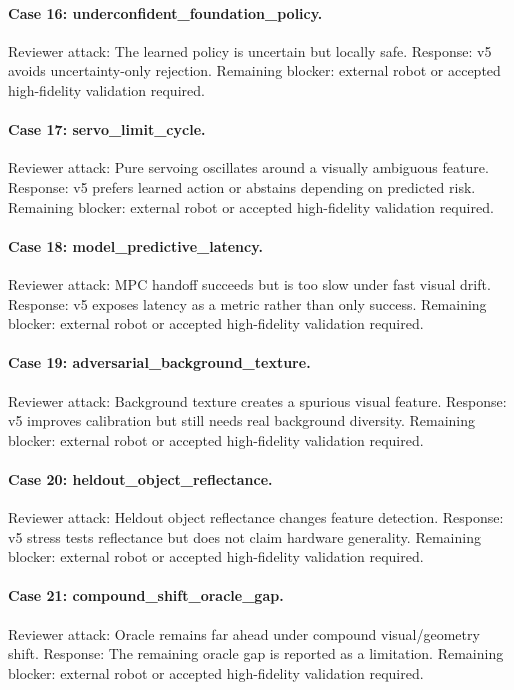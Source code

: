 \documentclass{article}
\begin{document}
\paragraph{Case 16: underconfident\_foundation\_policy.} Reviewer attack: The learned policy is uncertain but locally safe. Response: v5 avoids uncertainty-only rejection. Remaining blocker: external robot or accepted high-fidelity validation required.
\paragraph{Case 17: servo\_limit\_cycle.} Reviewer attack: Pure servoing oscillates around a visually ambiguous feature. Response: v5 prefers learned action or abstains depending on predicted risk. Remaining blocker: external robot or accepted high-fidelity validation required.
\paragraph{Case 18: model\_predictive\_latency.} Reviewer attack: MPC handoff succeeds but is too slow under fast visual drift. Response: v5 exposes latency as a metric rather than only success. Remaining blocker: external robot or accepted high-fidelity validation required.
\paragraph{Case 19: adversarial\_background\_texture.} Reviewer attack: Background texture creates a spurious visual feature. Response: v5 improves calibration but still needs real background diversity. Remaining blocker: external robot or accepted high-fidelity validation required.
\paragraph{Case 20: heldout\_object\_reflectance.} Reviewer attack: Heldout object reflectance changes feature detection. Response: v5 stress tests reflectance but does not claim hardware generality. Remaining blocker: external robot or accepted high-fidelity validation required.
\paragraph{Case 21: compound\_shift\_oracle\_gap.} Reviewer attack: Oracle remains far ahead under compound visual/geometry shift. Response: The remaining oracle gap is reported as a limitation. Remaining blocker: external robot or accepted high-fidelity validation required.
\end{document}
